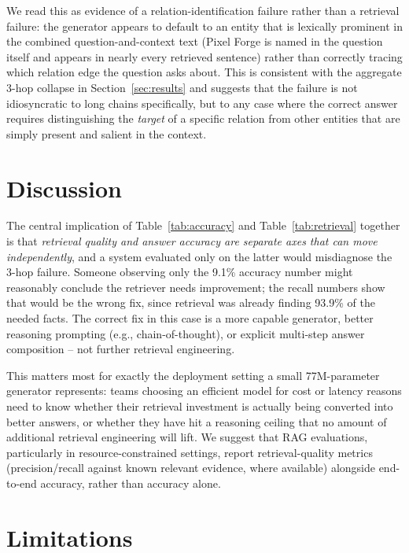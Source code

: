 \documentclass[11pt]{article}
\begin{document}
We read this as evidence of a relation-identification failure rather than a retrieval failure: the generator appears to default to an entity that is lexically prominent in the combined question-and-context text (Pixel Forge is named in the question itself and appears in nearly every retrieved sentence) rather than correctly tracing which relation edge the question asks about. This is consistent with the aggregate 3-hop collapse in Section~\ref{sec:results} and suggests that the failure is not idiosyncratic to long chains specifically, but to any case where the correct answer requires distinguishing the \emph{target} of a specific relation from other entities that are simply present and salient in the context.

\section{Discussion}

The central implication of Table~\ref{tab:accuracy} and Table~\ref{tab:retrieval} together is that \emph{retrieval quality and answer accuracy are separate axes that can move independently}, and a system evaluated only on the latter would misdiagnose the 3-hop failure. Someone observing only the 9.1\% accuracy number might reasonably conclude the retriever needs improvement; the recall numbers show that would be the wrong fix, since retrieval was already finding 93.9\% of the needed facts. The correct fix in this case is a more capable generator, better reasoning prompting (e.g., chain-of-thought), or explicit multi-step answer composition -- not further retrieval engineering.

This matters most for exactly the deployment setting a small 77M-parameter generator represents: teams choosing an efficient model for cost or latency reasons need to know whether their retrieval investment is actually being converted into better answers, or whether they have hit a reasoning ceiling that no amount of additional retrieval engineering will lift. We suggest that RAG evaluations, particularly in resource-constrained settings, report retrieval-quality metrics (precision/recall against known relevant evidence, where available) alongside end-to-end accuracy, rather than accuracy alone.

\section{Limitations}
\end{document}
